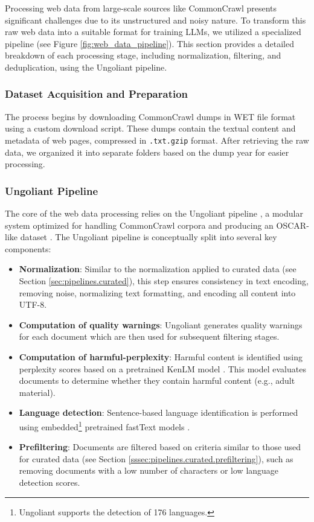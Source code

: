 Processing web data from large-scale sources like CommonCrawl presents significant challenges due to its unstructured and noisy nature. To transform this raw web data into a suitable format for training LLMs, we utilized a specialized pipeline (see Figure \ref{fig:web_data_pipeline}). This section provides a detailed breakdown of each processing stage, including normalization, filtering, and deduplication, using the Ungoliant pipeline.

\subsubsection{Dataset Acquisition and Preparation}
\label{sec:pipelines.web.prep}

The process begins by downloading CommonCrawl dumps in WET file format using a custom download script. These dumps contain the textual content and metadata of web pages, compressed in \texttt{.txt.gzip} format. After retrieving the raw data, we organized it into separate folders based on the dump year for easier processing.


\subsubsection{Ungoliant Pipeline}
\label{sec:pipelines.web.ung}

The core of the web data processing relies on the Ungoliant pipeline \cite{abadji_suarez_etal2021}, a modular system optimized for handling CommonCrawl corpora and producing an OSCAR-like dataset \cite{abadji_suarez_etal2022}. The Ungoliant pipeline is conceptually split into several key components:

\begin{itemize}
    \item \textbf{Normalization}: Similar to the normalization applied to curated data (see Section \ref{sec:pipelines.curated}), this step ensures consistency in text encoding, removing noise, normalizing text formatting, and encoding all content into UTF-8.
    \item \textbf{Computation of quality warnings}: Ungoliant generates quality warnings for each document which are then used for subsequent filtering stages.
    \item \textbf{Computation of harmful-perplexity}: Harmful content is identified using perplexity scores based on a pretrained KenLM model \cite{jansen_tong_etal2022}. This model evaluates documents to determine whether they contain harmful content (e.g., adult material).
    \item \textbf{Language detection}: Sentence-based language identification is performed using embedded\footnote{Ungoliant supports the detection of 176 languages. } pretrained fastText models \cite{joulin_grave_etal2016a,joulin_grave_etal2016b}. 
    \item \textbf{Prefiltering}: Documents are filtered based on criteria similar to those used for curated data (see Section \ref{sssec:pipelines.curated.prefiltering}), such as removing documents with a low number of characters or low language detection scores.
\end{itemize}


